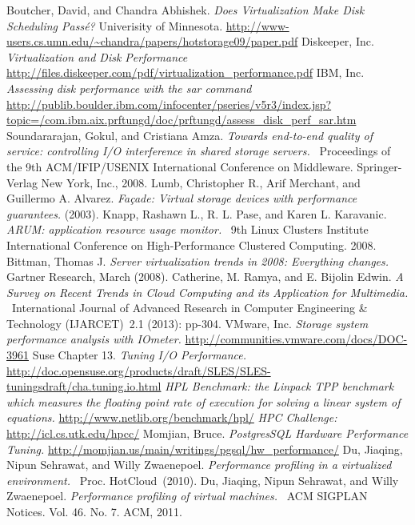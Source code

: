 \begin{thebibliography}{9}
Boutcher, David, and Chandra Abhishek. \emph{Does Virtualization Make Disk Scheduling Passé?}  Univerisity of Minnesota.  \url{http://www-users.cs.umn.edu/~chandra/papers/hotstorage09/paper.pdf}
Diskeeper, Inc.  \emph{Virtualization and Disk Performance}  \url{http://files.diskeeper.com/pdf/virtualization\_performance.pdf}
IBM, Inc. \emph{Assessing disk performance with the sar command}  \url{http://publib.boulder.ibm.com/infocenter/pseries/v5r3/index.jsp?topic=/com.ibm.aix.prftungd/doc/prftungd/assess\_disk\_perf\_sar.htm}
Soundararajan, Gokul, and Cristiana Amza.  \emph{Towards end-to-end quality of service: controlling I/O interference in shared storage servers.}  Proceedings of the 9th ACM/IFIP/USENIX International Conference on Middleware. Springer-Verlag New York, Inc., 2008.
Lumb, Christopher R., Arif Merchant, and Guillermo A. Alvarez.  \emph{Façade: Virtual storage devices with performance guarantees.}  (2003).
Knapp, Rashawn L., R. L. Pase, and Karen L. Karavanic.  \emph{ARUM: application resource usage monitor.}  9th Linux Clusters Institute International Conference on High-Performance Clustered Computing. 2008.
Bittman, Thomas J.  \emph{Server virtualization trends in 2008: Everything changes.}  Gartner Research, March (2008).
Catherine, M. Ramya, and E. Bijolin Edwin.  \emph{A Survey on Recent Trends in Cloud Computing and its Application for Multimedia.}  International Journal of Advanced Research in Computer Engineering \& Technology (IJARCET) 2.1 (2013): pp-304.
VMware, Inc. \emph{Storage system performance analysis with IOmeter.}  \url{http://communities.vmware.com/docs/DOC-3961}
Suse Chapter 13.  \emph{Tuning I/O Performance.}  \url{http://doc.opensuse.org/products/draft/SLES/SLES-tuningsdraft/cha.tuning.io.html}
\emph{HPL Benchmark: the Linpack TPP benchmark which measures the floating point rate of execution for solving a linear system of equations.}  \url{http://www.netlib.org/benchmark/hpl/}
\emph{HPC Challenge:}  \url{http://icl.cs.utk.edu/hpcc/}
Momjian, Bruce. \emph{PostgresSQL Hardware Performance Tuning.}  \url{http://momjian.us/main/writings/pgsql/hw\_performance/}
Du, Jiaqing, Nipun Sehrawat, and Willy Zwaenepoel.  \emph{Performance profiling in a virtualized environment.}  Proc. HotCloud (2010).
Du, Jiaqing, Nipun Sehrawat, and Willy Zwaenepoel.  \emph{Performance profiling of virtual machines.}  ACM SIGPLAN Notices. Vol. 46. No. 7. ACM, 2011.

\end{thebibliography}
